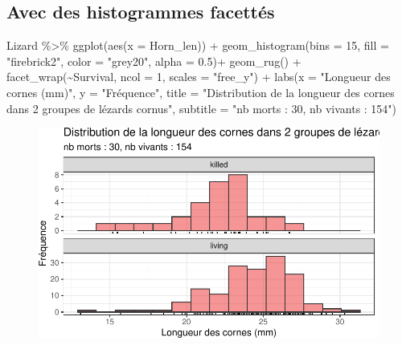\documentclass[
  a4paper,
  DIV=11,
  numbers=noendperiod,
  oneside]{scrreprt}
\newenvironment{Shaded}{}{}
\newcommand{\AttributeTok}[1]{\textcolor[rgb]{0.84,0.23,0.29}{#1}}
\newcommand{\DecValTok}[1]{\textcolor[rgb]{0.00,0.36,0.77}{#1}}
\newcommand{\FloatTok}[1]{\textcolor[rgb]{0.00,0.36,0.77}{#1}}
\newcommand{\FunctionTok}[1]{\textcolor[rgb]{0.44,0.26,0.76}{#1}}
\newcommand{\NormalTok}[1]{\textcolor[rgb]{0.14,0.16,0.18}{#1}}
\newcommand{\SpecialCharTok}[1]{\textcolor[rgb]{0.00,0.36,0.77}{#1}}
\newcommand{\StringTok}[1]{\textcolor[rgb]{0.01,0.18,0.38}{#1}}
\begin{document}
\hypertarget{sec-histofacet}{%
\subsection{Avec des histogrammes facettés}\label{sec-histofacet}}

\begin{Shaded}
\begin{Highlighting}[]
\NormalTok{Lizard }\SpecialCharTok{\%\textgreater{}\%}
  \FunctionTok{ggplot}\NormalTok{(}\FunctionTok{aes}\NormalTok{(}\AttributeTok{x =}\NormalTok{ Horn\_len)) }\SpecialCharTok{+}
  \FunctionTok{geom\_histogram}\NormalTok{(}\AttributeTok{bins =} \DecValTok{15}\NormalTok{, }\AttributeTok{fill =} \StringTok{"firebrick2"}\NormalTok{, }\AttributeTok{color =} \StringTok{"grey20"}\NormalTok{, }\AttributeTok{alpha =} \FloatTok{0.5}\NormalTok{)}\SpecialCharTok{+}
  \FunctionTok{geom\_rug}\NormalTok{() }\SpecialCharTok{+}
  \FunctionTok{facet\_wrap}\NormalTok{(}\SpecialCharTok{\textasciitilde{}}\NormalTok{Survival, }\AttributeTok{ncol =} \DecValTok{1}\NormalTok{, }\AttributeTok{scales =} \StringTok{"free\_y"}\NormalTok{) }\SpecialCharTok{+}
  \FunctionTok{labs}\NormalTok{(}\AttributeTok{x =} \StringTok{"Longueur des cornes (mm)"}\NormalTok{,}
       \AttributeTok{y =} \StringTok{"Fréquence"}\NormalTok{,}
       \AttributeTok{title =} \StringTok{"Distribution de la longueur des cornes dans 2 groupes de lézards cornus"}\NormalTok{,}
       \AttributeTok{subtitle =} \StringTok{"nb morts : 30, nb vivants : 154"}\NormalTok{)}
\end{Highlighting}
\end{Shaded}

\begin{figure}[H]

{\centering \includegraphics{03-TwoSampleTests_files/figure-pdf/unnamed-chunk-12-1.pdf}

}

\end{figure}
\end{document}
